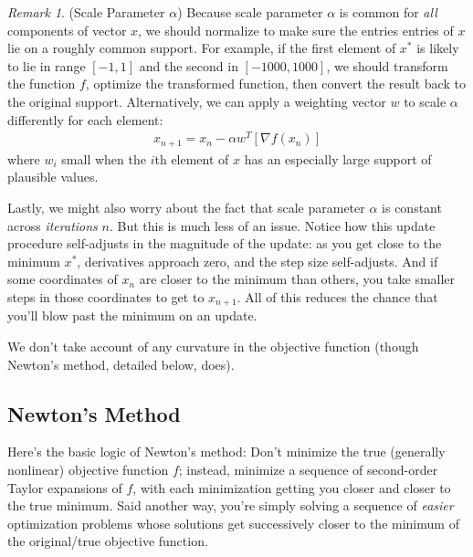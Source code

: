 \documentclass[12pt]{book}
\numberwithin{equation}{section} %
\theoremstyle{plain}
\theoremstyle{definition}
\theoremstyle{remark}
\newtheorem*{rmk}{Remark}
\begin{document}
\begin{rmk}(Scale Parameter $\alpha$)
Because scale parameter $\alpha$ is common for \emph{all} components of
vector $x$, we should normalize to make sure the entries entries of $x$
lie on a roughly common support.
For example, if the first element of $x^*$ is likely to lie in range
$[-1,1]$ and the second in $[-1000,1000]$, we should transform the
function $f$, optimize the transformed function, then convert the result
back to the original support.  Alternatively, we can apply a weighting
vector $w$ to scale $\alpha$ differently for each element:
\begin{align}
  x_{n+1} = x_n - \alpha w^T [\nabla f(x_n)]
\end{align}
where $w_i$ small when the $i$th element of $x$ has an especially large
support of plausible values.

Lastly, we might also worry about the fact that scale parameter $\alpha$
is constant across \emph{iterations} $n$.
But this is much less of an issue.
Notice how this update procedure self-adjusts in the magnitude of the
update: as you get close to the minimum $x^*$, derivatives approach
zero, and the step size self-adjusts.  And if some coordinates of $x_n$
are closer to the minimum than others, you take smaller steps in those
coordinates to get to $x_{n+1}$.  All of this reduces the chance that
you'll blow past the minimum on an update.
\end{rmk}

We don't take account of any curvature in the objective function (though
Newton's method, detailed below, does).


\clearpage
\subsection{Newton's Method}

Here's the basic logic of Newton's method: Don't minimize the true
(generally nonlinear) objective function $f$; instead, minimize a
sequence of second-order Taylor expansions of $f$, with each
minimization getting you closer and closer to the true minimum.
Said another way, you're simply solving a sequence of \emph{easier}
optimization problems whose solutions get successively closer to the
minimum of the original/true objective function.
\end{document}
